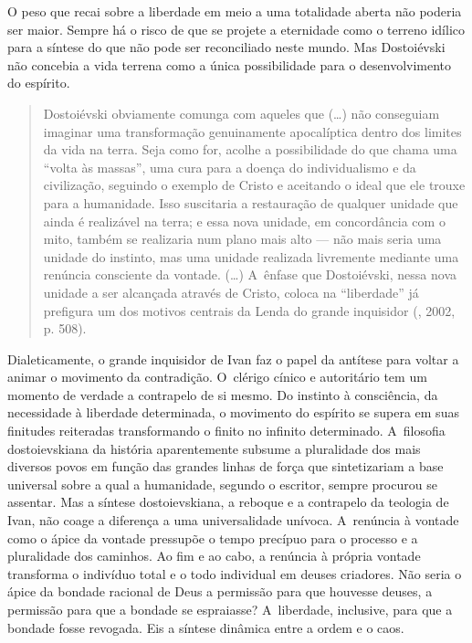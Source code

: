 O peso que recai sobre a liberdade em meio a uma totalidade aberta não
poderia ser maior. Sempre há o risco de que se projete a eternidade como
o terreno idílico para a síntese do que não pode ser reconciliado neste
mundo. Mas Dostoiévski não concebia a vida terrena como a única
possibilidade para o desenvolvimento do espírito.

\begin{quote}
Dostoiévski obviamente comunga com aqueles que (\ldots) não conseguiam
imaginar uma transformação genuinamente apocalíptica dentro dos limites
da vida na terra. Seja como for, acolhe a possibilidade do que chama uma
``volta às massas'', uma cura para a doença do individualismo e da
civilização, seguindo o exemplo de Cristo e aceitando o ideal que ele
trouxe para a humanidade. Isso suscitaria a restauração de qualquer
unidade que ainda é realizável na terra; e essa nova unidade, em
concordância com o mito, também se realizaria num plano mais alto --- não
mais seria uma unidade do instinto, mas uma unidade realizada livremente
mediante uma renúncia consciente da vontade. (\ldots) A~ênfase que
Dostoiévski, nessa nova unidade a ser alcançada através de Cristo,
coloca na ``liberdade'' já prefigura um dos motivos centrais da Lenda do
grande inquisidor (, 2002, p. 508).
\end{quote}

Dialeticamente, o grande inquisidor de Ivan faz o papel da antítese para
voltar a animar o movimento da contradição. O~clérigo cínico e
autoritário tem um momento de verdade a contrapelo de si mesmo. Do
instinto à consciência, da necessidade à liberdade determinada, o
movimento do espírito se supera em suas finitudes reiteradas
transformando o finito no infinito determinado. A~filosofia
dostoievskiana da história aparentemente subsume a pluralidade dos mais
diversos povos em função das grandes linhas de força que sintetizariam a
base universal sobre a qual a humanidade, segundo o escritor, sempre
procurou se assentar. Mas a síntese dostoievskiana, a reboque e a
contrapelo da teologia de Ivan, não coage a diferença a uma
universalidade unívoca. A~renúncia à vontade como o ápice da vontade
pressupõe o tempo precípuo para o processo e a pluralidade dos caminhos.
Ao fim e ao cabo, a renúncia à própria vontade transforma o indivíduo
total e o todo individual em deuses criadores. Não seria o ápice da
bondade racional de Deus a permissão para que houvesse deuses, a
permissão para que a bondade se espraiasse? A~liberdade, inclusive, para
que a bondade fosse revogada. Eis a síntese dinâmica entre a ordem e o
caos.

